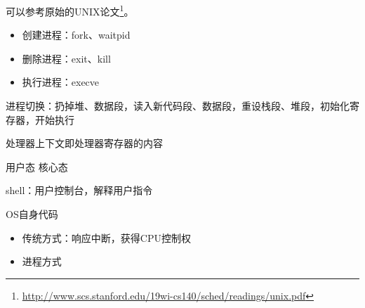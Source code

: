可以参考原始的UNIX论文\footnote{\url{http://www.scs.stanford.edu/19wi-cs140/sched/readings/unix.pdf}}。
\begin{itemize}
	\item 创建进程：fork、waitpid
	\item 删除进程：exit、kill
	\item 执行进程：execve
\end{itemize}

进程切换：扔掉堆、数据段，读入新代码段、数据段，重设栈段、堆段，初始化寄存器，开始执行



处理器上下文即处理器寄存器的内容
用户态 核心态

shell：用户控制台，解释用户指令

OS自身代码
\begin{itemize}
	\item 传统方式：响应中断，获得CPU控制权
	\item 进程方式
\end{itemize}